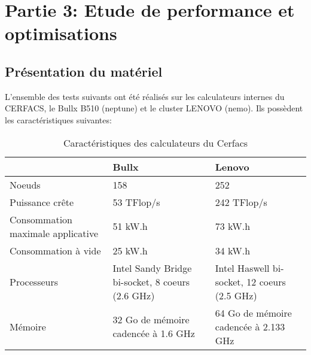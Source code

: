 \section{Partie 3: Etude de performance et optimisations}
\subsection{Présentation du matériel}
L'ensemble des tests suivants ont été réalisés sur les calculateurs internes du CERFACS, le Bullx B510 (neptune) et le cluster LENOVO (nemo). Ils possèdent les caractéristiques suivantes:

\begin{table}[h]
  \begin{center}
    \begin{tabular}{|M{3.5cm}|M{5cm}|M{5cm}|}
      \hline
      & Bullx & Lenovo \\
      \hline
      Noeuds & 158 & 252 \\
      \hline
      Puissance crête & 53 TFlop/s & 242 TFlop/s \\
      \hline
      Consommation maximale applicative & 51 kW.h & 73 kW.h \\
      \hline
      Consommation à vide & 25 kW.h & 34 kW.h \\
      \hline
      Processeurs & Intel Sandy Bridge bi-socket, 8 coeurs (2.6 GHz) & Intel Haswell bi-socket, 12 coeurs (2.5 GHz) \\
      \hline
      Mémoire & 32 Go de mémoire cadencée à 1.6 GHz & 64 Go de mémoire cadencée à 2.133 GHz \\
      \hline
    \end{tabular}
  \end{center}
  \caption{\label{tab:carac}Caractéristiques des calculateurs du Cerfacs}
\end{table}


